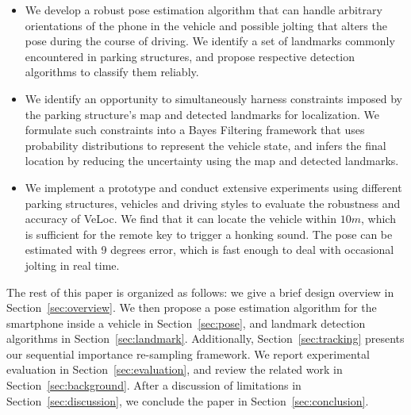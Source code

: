 
\begin{itemize}
  \item We develop a robust pose estimation algorithm that can handle arbitrary orientations of the phone in the vehicle and possible jolting that alters the pose during the course of driving. We identify a set of landmarks commonly encountered in parking structures, and propose respective detection algorithms to classify them reliably.
  \item We identify an opportunity to simultaneously harness constraints imposed by the parking structure's map and detected landmarks for localization. We formulate such constraints into a Bayes Filtering framework that uses probability distributions to represent the vehicle state, and infers the final location by reducing the uncertainty using the map and detected landmarks.
  \item We implement a prototype and conduct extensive experiments using different parking structures, vehicles and driving styles to evaluate the robustness and accuracy of VeLoc. We find that it can locate the vehicle within $10m$, which is sufficient for the remote key to trigger a honking sound. The pose can be estimated with 9 degrees error, which is fast enough to deal with occasional jolting in real time. %
\end{itemize}

The rest of this paper is organized as follows: we give a brief design overview in Section~\ref{sec:overview}. We then propose a pose estimation algorithm for the smartphone inside a vehicle in Section~\ref{sec:pose}, and landmark detection algorithms in Section~\ref{sec:landmark}. Additionally, Section~\ref{sec:tracking} presents our sequential importance re-sampling framework. We report experimental evaluation in Section~\ref{sec:evaluation}, and review the related work in Section~\ref{sec:background}. After a discussion of limitations in Section~\ref{sec:discussion}, we conclude the paper in Section~\ref{sec:conclusion}.
